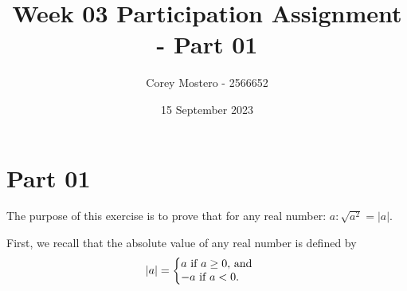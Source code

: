 \documentclass{article}
\title{Week 03 Participation Assignment - Part 01}
\author{Corey Mostero - 2566652}
\date{15 September 2023}
\begin{document}
\newcommand{\hr}{\par\noindent\rule{\textwidth}{0.4pt}}

\newcommand{\bc}[1]{
	\begin{equation*}
		\begin{boxed}
			{#1}
		\end{boxed}
	\end{equation*}
}

\newcommand{\cond}[2]{
	\ifmmode
		{#1} \quad {#2}
	\else
		$$ {#1} \quad {#2} $$
	\fi
}

\newcommand{\matr}[1]{
	\ifmmode \bm{#1}
	\else \textit{\textbf{#1}}
	\fi
}
\newcommand{\vect}[1]{
	\ifmmode \mathbf{#1}
	\else \textbf{#1}
	\fi
}


\maketitle
\newpage

\tableofcontents

\section{Part 01}

The purpose of this exercise is to prove that for any real number: $ a: \sqrt{ a^2 } = \left| a \right| $.

First, we recall that the absolute value of any real number is defined by
\begin{align*}
	|a| & =
	\left\{
		\begin{array}{@{}l@{}}
			a \text{ if $ a \geq 0 $, and } \\
			-a \text{ if $ a < 0 $. }
		\end{array}
	\right.
\end{align*}
\end{document}

